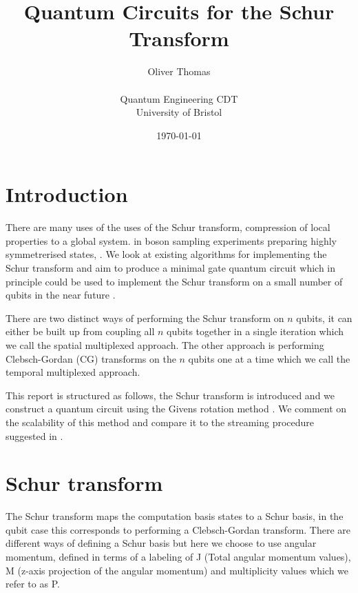 \documentclass[12pt]{article}
\begin{document}

    \title{Quantum Circuits for the Schur Transform}
    \author{Oliver Thomas \\[0.5em] \\ Quantum Engineering CDT \\ University of Bristol}
    \date{\today}
    \maketitle


\section{Introduction}

There are many uses of the uses of the Schur transform, compression of local properties to a global system. in boson sampling experiments preparing highly symmetrerised states, \cite{moylett2018quantum}. 
We look at existing algorithms for implementing the Schur transform and aim to produce a minimal gate quantum circuit which in principle could be used to implement the Schur transform on a small number of qubits in the near future \cite{kirby2017practical}.

There are two distinct ways of performing the Schur transform on $n$ qubits, it can either be built up from coupling all $n$ qubits together in a single iteration which we call the spatial multiplexed approach. The
other approach is performing Clebsch-Gordan (CG) transforms on the $n$ qubits one at a time which we call the temporal multiplexed approach.  

This report is structured as follows, the Schur transform is introduced and we construct a quantum circuit using the Givens rotation method \cite{li2013decomposition}. We comment on the scalability of this method and compare it to the streaming procedure suggested in \cite{bacon2006efficient}. 

\section{Schur transform}

The Schur transform maps the computation basis states to a Schur basis, in the qubit case this corresponds to performing a Clebsch-Gordan transform. There are different ways of defining a Schur basis but here we choose to use angular momentum, defined in terms of a labeling of J (Total angular momentum values), M (z-axis projection of the angular momentum) and multiplicity values which we refer to as P.
\end{document}
